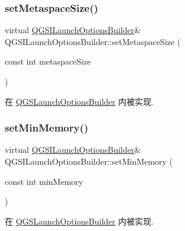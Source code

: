 \subsubsection{\texorpdfstring{set\+Metaspace\+Size()}{setMetaspaceSize()}}
{\footnotesize\ttfamily virtual \mbox{\hyperlink{class_q_g_s_i_launch_options_builder}{Q\+G\+S\+I\+Launch\+Options\+Builder}}\& Q\+G\+S\+I\+Launch\+Options\+Builder\+::set\+Metaspace\+Size (\begin{DoxyParamCaption}\item[{const int}]{metaspace\+Size }\end{DoxyParamCaption})\hspace{0.3cm}{\ttfamily [pure virtual]}}



在 \mbox{\hyperlink{class_q_g_s_launch_options_builder_a4c09c32f28b985ae9e47e1aab5f27b22}{Q\+G\+S\+Launch\+Options\+Builder}} 内被实现.

\mbox{\label{class_q_g_s_i_launch_options_builder_a7a33701b3c4b06343071c7073285744d}} 
\subsubsection{\texorpdfstring{set\+Min\+Memory()}{setMinMemory()}}
{\footnotesize\ttfamily virtual \mbox{\hyperlink{class_q_g_s_i_launch_options_builder}{Q\+G\+S\+I\+Launch\+Options\+Builder}}\& Q\+G\+S\+I\+Launch\+Options\+Builder\+::set\+Min\+Memory (\begin{DoxyParamCaption}\item[{const int}]{min\+Memory }\end{DoxyParamCaption})\hspace{0.3cm}{\ttfamily [pure virtual]}}



在 \mbox{\hyperlink{class_q_g_s_launch_options_builder_ae99865719a1a7df01ce052be1fbfea5a}{Q\+G\+S\+Launch\+Options\+Builder}} 内被实现.

\mbox{\label{class_q_g_s_i_launch_options_builder_a5e1555d99d7bb16da007dd9e2fd88e9a}} 

